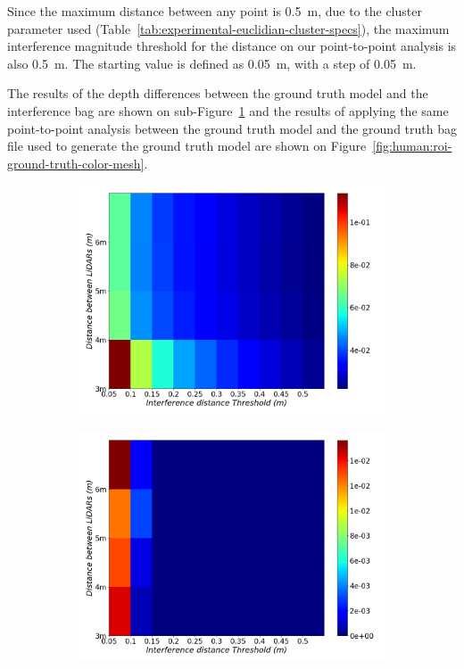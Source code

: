 Since the maximum distance between any point is \SI{0.5}{\meter}, due to the cluster parameter used (Table~\ref{tab:experimental-euclidian-cluster-specs}), the maximum interference magnitude threshold for the distance on our point-to-point analysis is also \SI{0.5}{\meter}. The starting value is defined as \SI{0.05}{\meter}, with a step of \SI{0.05}{\meter}.

The results of the depth differences between the ground truth model and the interference bag are shown on sub-Figure~\ref{fig:human:roi-interference-color-mesh} and the results of applying the same point-to-point analysis between the ground truth model and the ground truth bag file used to generate the ground truth model are shown on Figure~\ref{fig:human:roi-ground-truth-color-mesh}.

\begin{figure}[!ht]
	\centering
	\begin{subfigure}[c]{0.45\textwidth}
		\centering
		\includegraphics[width=\textwidth]{img/lidar-interference/human/interference_roi_distance_color_mesh.png}
		\caption{}
		\label{fig:human:roi-interference-color-mesh}
	\end{subfigure}
	\qquad
	\begin{subfigure}[c]{0.45\textwidth}
		\centering
		\includegraphics[width=\textwidth]{img/lidar-interference/human/ground_truth_roi_distance_color_mesh.png}

\end{subfigure}
\end{figure}
